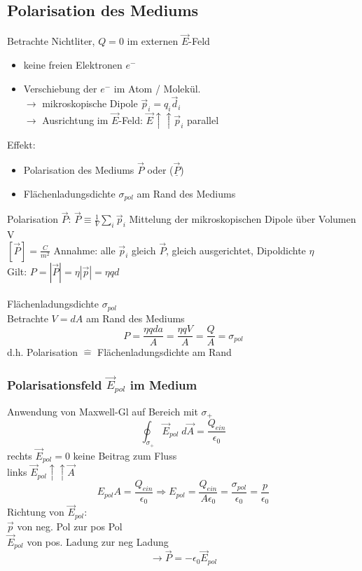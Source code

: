 \documentclass[titlepage,12pt,a4paper,ngerman]{report}
\begin{document}
\subsection{Polarisation des Mediums}
Betrachte Nichtliter, $Q=0$ im externen $\vec{E}$-Feld
\begin{itemize}
\item keine freien Elektronen $e^-$
\item Verschiebung der $e^-$ im Atom / Molekül.\\
$\rightarrow$ mikroskopische Dipole $\vec{p}_i = q_i \vec{d}_i$\\
$\rightarrow$ Ausrichtung im $\vec{E}$-Feld: $\vec{E} \uparrow \uparrow \vec{p}_i$ parallel
\end{itemize}
Effekt:
\begin{itemize}
\item Polarisation des Mediums $\vec{P}$ oder ($\underline{\vec{P}}$)
\item Flächenladungsdichte $\sigma_{pol} $ am Rand des Mediums
\end{itemize}
Polarisation $\vec{P}$: $\vec{P} \equiv \frac{1}{V} \sum_i \vec{p}_i$ Mittelung der mikroskopischen Dipole über Volumen V\\
$[\vec{P}] = \frac{C}{m^2}$
Annahme: alle $\vec{p}_i$ gleich $\vec{P}$, gleich ausgerichtet, Dipoldichte $\eta$\\
Gilt: $P = |\vec{P}| = \eta |\vec{p}| = \eta q d$\\\\
Flächenladungsdichte $\sigma_{pol}$\\
Betrachte $V = dA$ am Rand des Mediums
$$ P = \frac{\eta q d a}{A} = \frac{\eta q V }{A} = \frac{Q}{A} = \sigma_{pol}$$
d.h. Polarisation $\widehat{=}$ Flächenladungsdichte am Rand
\subsubsection{Polarisationsfeld $\vec{E}_{pol}$ im Medium}
Anwendung von Maxwell-Gl auf Bereich mit $\sigma_+$ 
$$\oint_{\sigma_+} \vec{E}_{pol} \; d\vec{A} = \frac{Q_{ein}}{\epsilon_0}$$
rechts $\vec{E}_{pol} = 0$ keine Beitrag zum Fluss\\
links $ \vec{E}_{pol} \uparrow \uparrow \vec{A}$\\
$$E_{pol} A = \frac{Q_{ein}}{\epsilon_0} \Rightarrow E_{pol} = \frac{Q_{ein}}{A \epsilon_0} = \frac{\sigma_{pol}}{\epsilon_0} = \frac{p}{\epsilon_0}$$
Richtung von $\vec{E}_{pol}$: \\
$\vec{p}$ von neg. Pol zur pos Pol\\
$ \vec{E}_{pol}$ von pos. Ladung zur neg Ladung\\
$$ \rightarrow \vec{P} = - \epsilon_0 \vec{E}_{pol}$$
\end{document}
